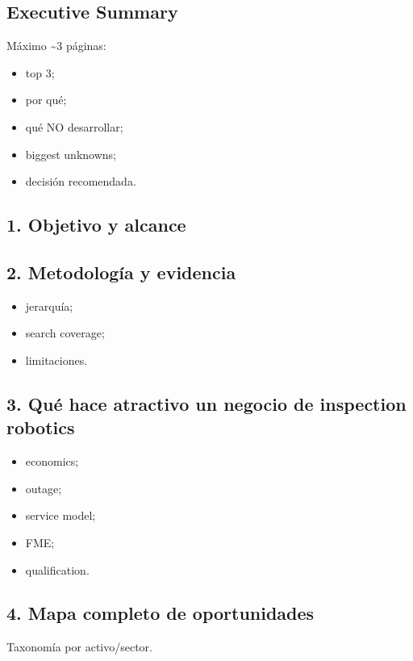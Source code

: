 \documentclass[11pt,a4paper]{article}
\begin{document}
\subsection*{Executive Summary}
Máximo \textasciitilde{}3 páginas:

\begin{itemize}
\item top 3;
\item por qué;
\item qué NO desarrollar;
\item biggest unknowns;
\item decisión recomendada.
\end{itemize}


\subsection*{1. Objetivo y alcance}

\subsection*{2. Metodología y evidencia}
\begin{itemize}
\item jerarquía;
\item search coverage;
\item limitaciones.
\end{itemize}


\subsection*{3. Qué hace atractivo un negocio de inspection robotics}
\begin{itemize}
\item economics;
\item outage;
\item service model;
\item FME;
\item qualification.
\end{itemize}


\subsection*{4. Mapa completo de oportunidades}
Taxonomía por activo/sector.
\end{document}
